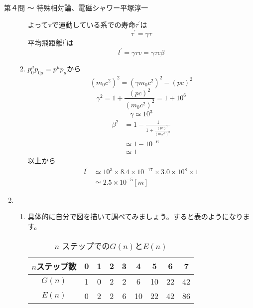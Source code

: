 \begin{answer}{第４問 〜 特殊相対論、電磁シャワー}{平塚淳一}
\begin{enumerate}
\begin{enumerate}
    よってvで運動している系での寿命$\tau^{\prime}$は
    \begin{equation}
    \tau^{\prime}=\gamma \tau
    \end{equation}
    平均飛距離$l^{\prime}$は
    \begin{equation}
    l^{\prime}=\gamma\tau v =\gamma\tau c\beta
    \end{equation}
  \item $p^{\mu}_0p_{0\mu}=p^{\mu}p_{\mu}$から
    \begin{equation}
    (m_0c^2)^2=(\gamma m_0c^2)^2 -(pc)^2
    \end{equation}
    \begin{equation}
    \gamma^2=1+\frac{(pc)^2}{(m_0c^2)^2}=1+10^6
    \end{equation}
    \begin{equation}
    \gamma \simeq 10^3
    \end{equation}
    \begin{align}
    \beta^2&=1-\frac{1}{1+\frac{(pc)^2}{(m_0c^2)^2}}\\
    &\simeq 1-10^{-6}\\
    &\simeq 1
    \end{align}
    以上から
    \begin{align}
    l^{\prime} &\simeq10^3 \times 8.4\times 10^{-17} \times 3.0 \times 10^8 \times 1\\
    &\simeq　2.5 \times 10^{-5} [m]
    \end{align}
  \end{enumerate}
\item 
  \begin{enumerate}
  \item 具体的に自分で図を描いて調べてみましょう。すると表のようになります。
    \begin{table}
      \begin{center}
        \caption{$n$ ステップでの$G(n)$と$E(n)$}
        \begin{tabular}{ccccccccc}
          \hline
           $n$ステップ数 & 0 & 1 & 2 & 3 & 4 & 5 & 6 & 7  \\
          \hline
           $G(n)$ & 1 & 0 & 2 & 2 & 6 & 10 & 22 & 42 \\
          \hline
           $E(n)$ & 0 & 2 & 2 & 6 & 10 & 22 & 42 & 86 \\
          \hline
        \end{tabular}
      \end{center}

\end{table}
\end{enumerate}
\end{enumerate}
\end{answer}
